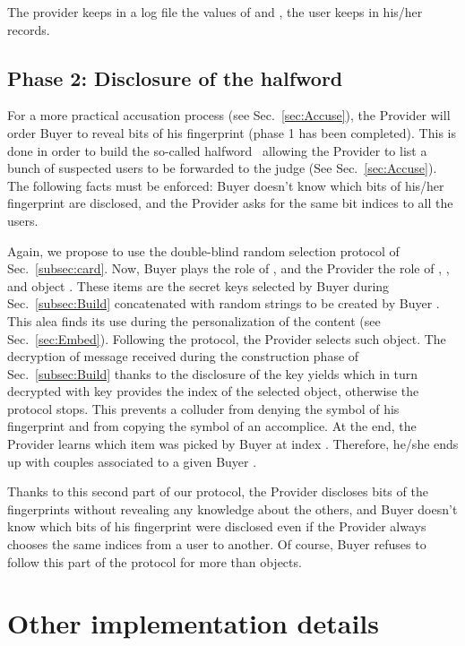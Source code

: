 \documentclass{article}
\begin{document}
The provider keeps in a log file the values of  and
, the user keeps  in his/her records.


\subsection{Phase 2: Disclosure of the halfword}
\label{subsec:halfword}

For a more practical accusation process (see Sec.~\ref{sec:Accuse}),
the Provider will order Buyer  to reveal  bits of his
fingerprint (phase 1 has been completed). This is done in order to build the so-called
halfword~\cite{PfitzmannAsym} allowing the Provider to list a bunch of
suspected users to be forwarded to the judge (See
Sec.~\ref{sec:Accuse}).  The following facts must be enforced: Buyer
 doesn't know which bits of his/her fingerprint are disclosed, and
the Provider asks for the same bit indices to all the users.
  
Again, we propose to use the double-blind random selection protocol of Sec.~\ref{subsec:card}.
Now, Buyer  plays the role of , and the Provider the role of
, , and object
. These items are the  secret
keys selected by Buyer  during Sec.~\ref{subsec:Build} concatenated
with random strings  to be created by Buyer
. This alea finds its use during the personalization of the content
(see Sec.~\ref{sec:Embed}). Following the protocol, the Provider
selects  such object. The decryption of message 
received during the construction phase of Sec.~\ref{subsec:Build}
thanks to the disclosure of the key  yields 
which in turn decrypted with key  provides the index of the
selected object, otherwise the protocol stops. This prevents a
colluder from denying the symbol of his fingerprint and from copying
the symbol of an accomplice. At the end, the Provider learns which
item was picked by Buyer  at index . Therefore, he/she ends up with
 couples  associated to a
given Buyer .

Thanks to this second part of our protocol, the Provider discloses  bits of the
fingerprints without revealing any knowledge about the others, and Buyer
 doesn't know which bits of his fingerprint were disclosed even if
the Provider always chooses the same indices from a user to another.
Of course, Buyer  refuses to follow this part of the protocol for more than  objects.

\section{Other implementation details}
\label{sec:wmaccuse}
\end{document}
